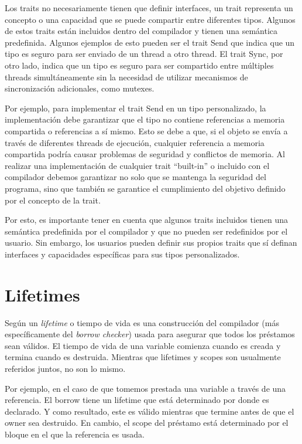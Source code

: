 Los traits no necesariamente tienen que definir interfaces, un trait representa un concepto o una capacidad que se puede compartir entre diferentes tipos. Algunos de estos traits están incluidos dentro del compilador y tienen una semántica predefinida. Algunos ejemplos de esto pueden ser el trait Send que indica que un tipo es seguro para ser enviado de un thread a otro thread. El trait Sync, por otro lado, indica que un tipo es seguro para ser compartido entre múltiples threads simultáneamente sin la necesidad de utilizar mecanismos de sincronización adicionales, como mutexes. 

Por ejemplo, para implementar el trait Send en un tipo personalizado, la implementación debe garantizar que el tipo no contiene referencias a memoria compartida o referencias a sí mismo. Esto se debe a que, si el objeto se envía a través de diferentes threads de ejecución, cualquier referencia a memoria compartida podría causar problemas de seguridad y conflictos de memoria. Al realizar una implementación de cualquier trait ``built-in'' o incluido con el compilador debemos garantizar no solo que se mantenga la seguridad del programa, sino que también se garantice el cumplimiento del objetivo definido por el concepto de la trait.

Por esto, es importante tener en cuenta que algunos traits incluidos tienen una semántica predefinida por el compilador y que no pueden ser redefinidos por el usuario. Sin embargo, los usuarios pueden definir sus propios traits que sí definan interfaces y capacidades específicas para sus tipos personalizados.

\section{Lifetimes}

Según  un \textit{lifetime} o tiempo de vida es una construcción del compilador (más específicamente del \textit{borrow checker}) usada para asegurar que todos los préstamos sean válidos. El tiempo de vida de una variable comienza cuando es creada y termina cuando es destruida. Mientras que lifetimes y scopes son usualmente referidos juntos, no son lo mismo.

Por ejemplo, en el caso de que tomemos prestada una variable a través de una referencia. El borrow tiene un lifetime que está determinado por donde es declarado. Y como resultado, este es válido mientras que termine antes de que el owner sea destruido. En cambio, el scope del préstamo está determinado por el bloque en el que la referencia es usada.

